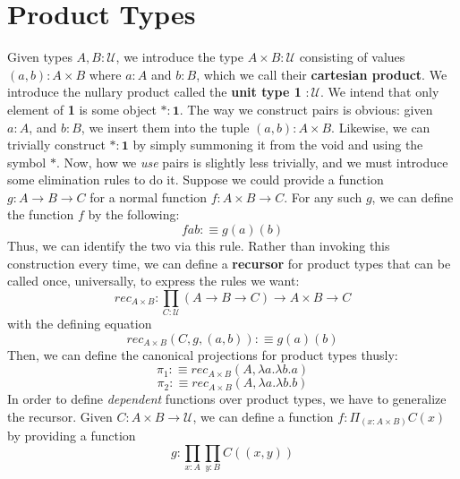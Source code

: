 \documentclass[letterpaper, 10 pt, conference]{ieeeconf}  %
\begin{document}
\section{Product Types}
Given types $A,B : \mathcal{U}$, we introduce the type $A \times B : \mathcal{U}$ consisting of values $(a,b) : A \times B$ where $a : A$ and $b : B$, which we call their \textbf{cartesian product}. We introduce the nullary product called the \textbf{unit type 1} $ : \mathcal{U}$. We intend that only element of \textbf{1} is some object $* : \textbf{1}$. The way we construct pairs is obvious: given $a : A$, and $b : B$, we insert them into the tuple $(a, b) : A \times B$. Likewise, we can trivially construct $* : \textbf{1}$ by simply summoning it from the void and using the symbol $*$. Now, how we \textit{use} pairs is slightly less trivially, and we must introduce some elimination rules to do it. Suppose we could provide a function $g : A \rightarrow B \rightarrow C$ for a normal function $f : A \times B \rightarrow C$. For any such $g$, we can define the function $f$ by the following:
\begin{equation}
    f a b :\equiv g(a)(b)
\end{equation}
Thus, we can identify the two via this rule. Rather than invoking this construction every time, we can define a \textbf{recursor} for product types that can be called once, universally, to express the rules we want: 
\begin{equation}
    rec_{A \times B} : \prod_{C:\mathcal{U}} (A \rightarrow B \rightarrow C) \rightarrow A \times B \rightarrow C
\end{equation}
with the defining equation
\begin{equation}
    rec_{A \times B}(C, g,(a,b)) :\equiv g(a)(b)
\end{equation}
Then, we can define the canonical projections for product types thusly:
\begin{equation}
    \pi_1 :\equiv rec_{A \times B}(A, \lambda a. \lambda b. a)
\end{equation}
\begin{equation}
    \pi_2 :\equiv rec_{A \times B}(A, \lambda a. \lambda b. b)
\end{equation}
In order to define \textit{dependent} functions over product types, we have to generalize the recursor. Given $C : A \times B \rightarrow \mathcal{U}$, we can define a function $f : \Pi_{(x:A\times B)} C(x)$ by providing a function
\begin{equation}
    g : \prod_{x:A} \prod_{y:B} C((x,y))
\end{equation}
\end{document}
